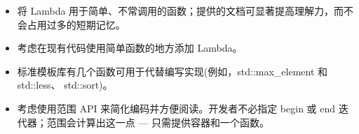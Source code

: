 
\begin{itemize}
\item
将 Lambda 用于简单、不常调用的函数；提供的文档可显著提高理解力，而不会占用过多的短期记忆。

\item
考虑在现有代码使用简单函数的地方添加 Lambda。

\item
标准模板库有几个函数可用于代替编写实现(例如，std::max\_element 和 std::less、 std::sort)。

\item
考虑使用范围 API 来简化编码并方便阅读。开发者不必指定 begin 或 end 迭代器；范围会计算出这一点 — 只需提供容器和一个函数。
\end{itemize}










